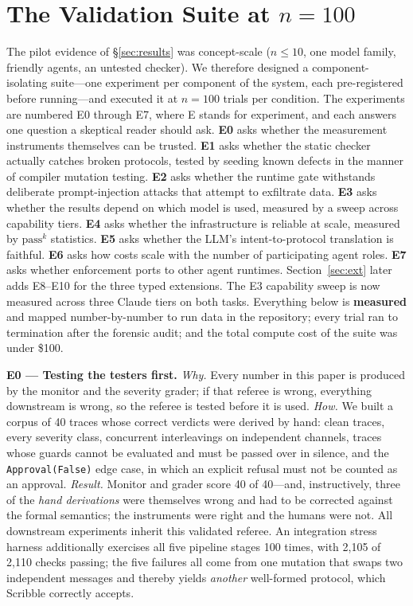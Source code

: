 \documentclass{article}
\begin{document}
\section{The Validation Suite at $n{=}100$}\label{sec:bench}
The pilot evidence of \S\ref{sec:results} was concept-scale ($n{\leq}10$, one model family, friendly agents, an untested checker). We therefore designed a component-isolating suite---one experiment per component of the system, each pre-registered before running---and executed it at $n{=}100$ trials per condition. The experiments are numbered E0 through E7, where E stands for experiment, and each answers one question a skeptical reader should ask. \textbf{E0} asks whether the measurement instruments themselves can be trusted. \textbf{E1} asks whether the static checker actually catches broken protocols, tested by seeding known defects in the manner of compiler mutation testing. \textbf{E2} asks whether the runtime gate withstands deliberate prompt-injection attacks that attempt to exfiltrate data. \textbf{E3} asks whether the results depend on which model is used, measured by a sweep across capability tiers. \textbf{E4} asks whether the infrastructure is reliable at scale, measured by $\mathrm{pass}^k$ statistics. \textbf{E5} asks whether the LLM's intent-to-protocol translation is faithful. \textbf{E6} asks how costs scale with the number of participating agent roles. \textbf{E7} asks whether enforcement ports to other agent runtimes. Section~\ref{sec:ext} later adds E8--E10 for the three typed extensions. The E3 capability sweep is now measured across three Claude tiers on both tasks. Everything below is \textbf{measured} and mapped number-by-number to run data in the repository; every trial ran to termination after the forensic audit; and the total compute cost of the suite was under \$100.

\textbf{E0 --- Testing the testers first.} \emph{Why.} Every number in this paper is produced by the monitor and the severity grader; if that referee is wrong, everything downstream is wrong, so the referee is tested before it is used. \emph{How.} We built a corpus of 40 traces whose correct verdicts were derived by hand: clean traces, every severity class, concurrent interleavings on independent channels, traces whose guards cannot be evaluated and must be passed over in silence, and the \texttt{Approval(False)} edge case, in which an explicit refusal must not be counted as an approval. \emph{Result.} Monitor and grader score 40 of 40---and, instructively, three of the \emph{hand derivations} were themselves wrong and had to be corrected against the formal semantics; the instruments were right and the humans were not. All downstream experiments inherit this validated referee. An integration stress harness additionally exercises all five pipeline stages 100 times, with 2{,}105 of 2{,}110 checks passing; the five failures all come from one mutation that swaps two independent messages and thereby yields \emph{another} well-formed protocol, which Scribble correctly accepts.
\end{document}
